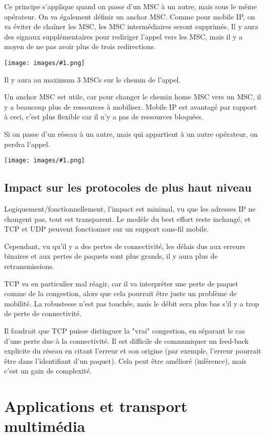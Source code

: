 \documentclass[10pt,a4paper]{report}
\newcommand{\dessin}[1]{\begin{center}\texttt{[image: images/\#1.png]}\end{center}}
\newcommand{\dessinS}[2]{\begin{center}\texttt{[image: images/\#1.png]}\end{center}}
\begin{document}
	Ce principe s'applique quand on passe d'un MSC à un autre, mais sous le même opérateur. On va également définir un anchor MSC. Comme pour mobile IP, on va éviter de chaîner les MSC, les MSC intermédiaires seront supprimés. Il y aura des signaux supplémentaires pour rediriger l'appel vers les MSC, mais il y a moyen de ne pas avoir plus de trois redirections.
	
	\dessinS{61}{.8}
	
	Il y aura au maximum 3 MSCs sur le chemin de l'appel.
	
	Un anchor MSC est utile, car pour changer le chemin home MSC vers un MSC, il y a beaucoup plus de ressources à mobiliser. Mobile IP est avantagé par rapport à ceci, c'est plus flexible car il n'y a pas de ressources bloquées.
	
	Si on passe d'un réseau à un autre, mais qui appartient à un autre opérateur, on perdra l'appel.
	
	\dessin{62}
		
	\section{Impact sur les protocoles de plus haut niveau}
	
	Logiquement/fonctionnellement, l'impact est minimal, vu que les adresses IP ne changent pas, tout est transparent. Le modèle du best effort reste inchangé, et TCP et UDP peuvent fonctionner sur un support sans-fil mobile.
	
	Cependant, vu qu'il y a des pertes de connectivité, les délais dus aux erreurs binaires et aux pertes de paquets sont plus grands, il y aura plus de retransmissions.
	
	TCP va en particulier mal réagir, car il va interpréter une perte de paquet comme de la congestion, alors que cela pourrait être juste un problème de mobilité. La robustesse n'est pas touchée, mais le débit sera plus bas s'il y a trop de perte de connectivité.
	
	Il faudrait que TCP puisse distinguer la "vrai" congestion, en séparant le cas d'une perte due à la connectivité. Il est difficile de communiquer un feed-back explicite du réseau en citant l'erreur et son origine (par exemple, l'erreur pourrait être dans l'identifiant d'un paquet). Cela peut être amélioré (inférence), mais c'est un gain de complexité.
	
		
	
\chapter{Applications et transport multimédia}
	
\end{document}
